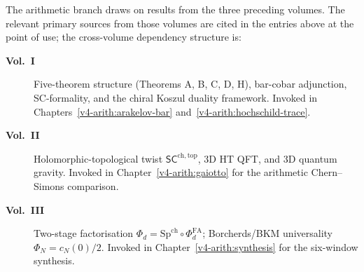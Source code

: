 The arithmetic branch draws on results from the three preceding volumes.
The relevant primary sources from those volumes are cited in the
entries above at the point of use; the cross-volume dependency
structure is:

\begin{description}
\item[\textbf{Vol.~I}] Five-theorem structure (Theorems A, B, C,
D, H), bar-cobar adjunction, SC-formality, and the chiral Koszul
duality framework. Invoked in Chapters~\ref{v4-arith:arakelov-bar}
and~\ref{v4-arith:hochschild-trace}.
\item[\textbf{Vol.~II}] Holomorphic-topological twist
\(\mathsf{SC}^{\mathrm{ch,top}}\), 3D HT QFT, and 3D quantum
gravity. Invoked in Chapter~\ref{v4-arith:gaiotto} for the
arithmetic Chern--Simons comparison.
\item[\textbf{Vol.~III}] Two-stage factorisation
\(\Phi_{d}=\mathrm{Sp}^{\mathrm{ch}}\circ\Phi^{\mathrm{FA}}_{d}\);
Borcherds/BKM universality \(\Phi_{N}=c_{N}(0)/2\). Invoked
in Chapter~\ref{v4-arith:synthesis} for the six-window synthesis.
\end{description}
